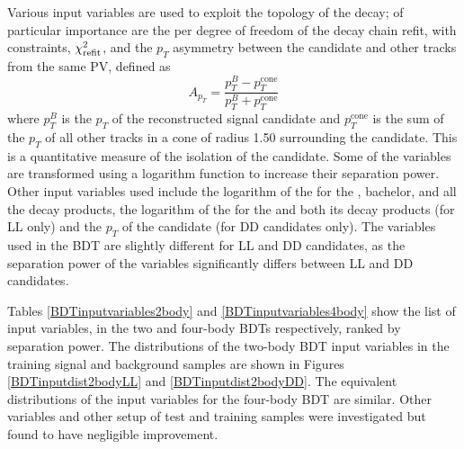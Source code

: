 Various input variables are used to exploit the topology of the decay; of particular importance are the \chisq per degree of freedom of the decay chain refit, with constraints, $\chi^2_\text{refit}$, and the $p_T$ asymmetry between the \Bm candidate and other tracks from the same PV, defined as
\begin{equation}
A_{p_T} = \frac{p_T^B - p_T^{\text{cone}}}{p_T^B + p_T^{\text{cone}}}
\label{ptasy}
\end{equation}
where $p_T^B$ is the $p_T$ of the reconstructed \Bm signal candidate and $p_T^{\text{cone}}$ is the sum of the $p_T$ of all other tracks in a cone of radius 1.50 surrounding the \Bm candidate. This is a quantitative measure of the isolation of the \Bm candidate. Some of the variables are transformed using a logarithm function to increase their separation power. Other input variables used include the logarithm of the \chisqip for the \Bm, bachelor, \Dz and all the \Dz decay products, the logarithm of the \chisqip for the \KS and both its decay products (for LL only) and the $p_T$ of the \KS candidate (for DD candidates only). The variables used in the BDT are slightly different for LL and DD candidates, as the separation power of the \KS variables significantly differs between LL and DD candidates. 

Tables \ref{BDTinputvariables2body} and \ref{BDTinputvariables4body} show the list of input variables, in the two and four-body BDTs respectively, ranked by separation power. The distributions of the two-body BDT input variables in the training signal and background samples are shown in Figures \ref{BDTinputdist2bodyLL} and \ref{BDTinputdist2bodyDD}. The equivalent distributions of the input variables for the four-body BDT are similar. Other variables and other setup of test and training samples were investigated but found to have negligible improvement.

